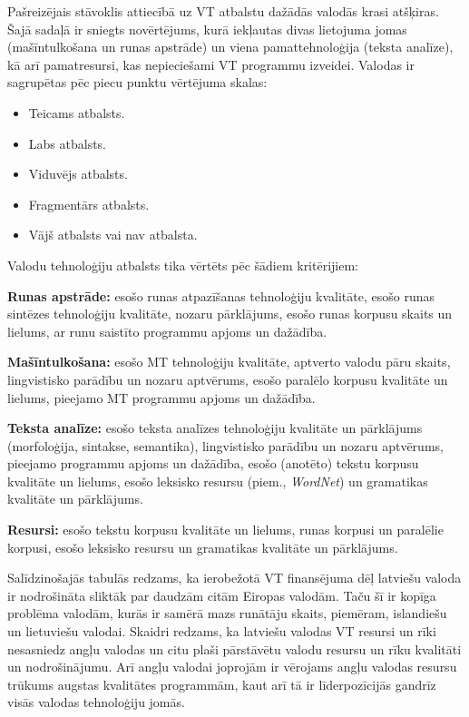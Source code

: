 \begin{multicols}{2}
Pašreizējais stāvoklis attiecībā uz VT atbalstu dažādās valodās krasi atšķiras.
Šajā sadaļā ir sniegts novērtējums, kurā iekļautas divas lietojuma jomas (mašīntulkošana un runas apstrāde) un viena pamattehnoloģija (teksta analīze), kā arī pamatresursi, kas nepieciešami VT programmu izveidei.
Valodas ir sagrupētas pēc piecu punktu vērtējuma skalas:

\begin{itemize}
\item Teicams atbalsts.
\item Labs atbalsts.
\item Viduvējs atbalsts.
\item Fragmentārs atbalsts.
\item Vājš atbalsts vai nav atbalsta.
\end{itemize}

Valodu tehnoloģiju atbalsts tika vērtēts pēc šādiem kritērijiem:

\textbf{Runas apstrāde:} esošo runas atpazīšanas tehnoloģiju kvalitāte, esošo runas sintēzes tehnoloģiju kvalitāte, nozaru pārklājums, esošo runas korpusu skaits un lielums, ar runu saistīto programmu apjoms un dažādība.

\textbf{Mašīntulkošana:} esošo MT tehnoloģiju kvalitāte, aptverto valodu pāru skaits, lingvistisko parādību un nozaru aptvērums, esošo paralēlo korpusu kvalitāte un lielums, pieejamo MT programmu apjoms un dažādība.

\textbf{Teksta analīze:} esošo teksta analīzes tehnoloģiju kvalitāte un pārklājums (morfoloģija, sintakse, semantika), lingvistisko parādību un nozaru aptvērums, pieejamo programmu apjoms un dažādība, esošo (anotēto) tekstu korpusu kvalitāte un lielums, esošo leksisko resursu (piem., \textit{WordNet}) un gramatikas kvalitāte un pārklājums.

\textbf{Resursi:} esošo tekstu korpusu kvalitāte un lielums, runas korpusi un paralēlie korpusi, esošo leksisko resursu un gramatikas kvalitāte un pārklājums.

Salīdzinošajās tabulās redzams, ka ierobežotā VT finansējuma dēļ latviešu valoda ir nodrošināta sliktāk par daudzām citām Eiropas valodām.
Taču šī ir kopīga problēma valodām, kurās ir samērā mazs runātāju skaits, piemēram, islandiešu un lietuviešu valodai.
Skaidri redzams, ka latviešu valodas VT resursi un rīki nesasniedz angļu valodas un citu plaši pārstāvētu valodu  resursu un rīku kvalitāti un nodrošinājumu.
Arī angļu valodai joprojām ir vērojams angļu valodas resursu trūkums augstas kvalitātes programmām, kaut arī tā ir līderpozīcijās gandrīz visās valodas tehnoloģiju jomās.


\end{multicols}
